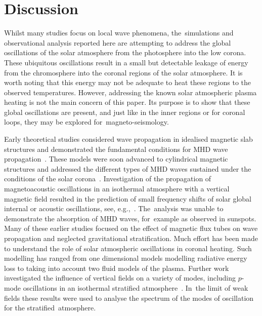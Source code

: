 \documentclass[physics,article,accept,pdftex,moreauthors]{Definitions/mdpi}
\begin{document}
\section{Discussion}
Whilst many studies focus on local wave phenomena, the~simulations and observational analysis reported here are attempting to address the global oscillations of the solar atmosphere from the photosphere into the low corona. These ubiquitous oscillations result in a small but detectable leakage of energy from the chromosphere  into the coronal regions of the solar atmosphere. It is worth noting that this energy may not be adequate to heat these regions to the observed temperatures. However, addressing the 
 {known}   
solar atmospheric plasma heating is not the main concern of this paper. Its purpose is to show that these global oscillations are present, and just like in the inner regions or for coronal loops, they may be explored for~magneto-seismology.

Early theoretical studies   considered wave propagation in idealised magnetic slab structures and demonstrated the fundamental conditions for  
 {MHD} %
wave propagation~\cite{Roberts1981a,Roberts1981b}. These models were soon advanced to cylindrical magnetic structures and addressed 
the different types of MHD waves sustained under the conditions of the solar corona~\cite{EdwinandRoberts1983}.  Investigation of the propagation of magnetoacoustic oscillations in an isothermal atmosphere with a vertical magnetic field resulted in the prediction of small frequency shifts of solar global internal or acoustic oscillations, see, e.g.,~\cite{Hindman1996}. The~analysis was unable to demonstrate the absorption of MHD waves,  for~example as observed in sunspots. Many of these  earlier studies  focused on the effect of magnetic flux tubes on wave propagation and neglected gravitational stratification. Much effort has been made to understand the role of solar atmospheric oscillations in coronal heating. Such modelling has ranged from one dimensional models modelling radiative energy loss to %
  taking into account two fluid models of the plasma. Further work investigated the influence of vertical fields on a variety of modes, including $p$-mode oscillations in an isothermal stratified atmosphere~\cite{Hasan1992}. In~the limit of weak fields these results were used to analyse the spectrum of the modes of oscillation for the stratified~atmosphere.
\end{document}

